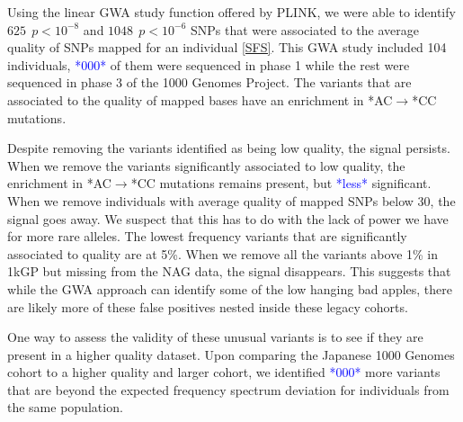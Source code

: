 \documentclass[9pt,lineno]{elife}
\newcommand{\todo}[1]{\textcolor{blue}{*#1*}}
\begin{document}
Using the linear GWA study function offered by PLINK, we were able to identify $625\ \  p < 10^{-8}$ and $1048\ \ p < 10^{-6}$ SNPs that were associated to the average quality of SNPs mapped for an individual \ref{SFS}.  This GWA study included 104 individuals, \todo{000} of them were sequenced in phase 1 while the rest were sequenced in phase 3 of the 1000 Genomes Project.
The variants that are associated to the quality of mapped bases have an enrichment in *AC${\rightarrow}$*CC mutations. 

Despite removing the variants identified as being low quality, the signal persists. 
When we remove the variants significantly associated to low quality, the enrichment in *AC${\rightarrow}$*CC mutations remains present, but \todo{less} significant. 
When we remove individuals with average quality of mapped SNPs below 30, the signal goes away. 
We suspect that this has to do with the lack of power we have for more rare alleles. 
The lowest frequency variants that are significantly associated to quality are at 5\%. 
When we remove all the variants above 1\% in 1kGP but missing from the NAG data, the signal disappears.
This suggests that while the GWA approach can identify some of the low hanging bad apples, there are likely more of these false positives nested inside these legacy cohorts. 

One way to assess the validity of these unusual variants is to see if they are present in a higher quality dataset. Upon comparing the Japanese 1000 Genomes cohort to a higher quality and larger cohort, we identified \todo{000} more variants that are beyond the expected frequency spectrum deviation for individuals from the same population. 
\end{document}
